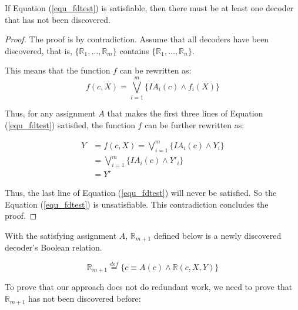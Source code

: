 \documentclass[journal]{IEEEtran}
\begin{document}
\begin{theorem}\label{thm_fdok1}
If Equation (\ref{equ_fdtest}) is satisfiable,
then there must be at least one decoder that has not been discovered.
\end{theorem}
\begin{proof}
The proof is by contradiction.
Assume that all decoders have been discovered,
that is,
$\{\mathbb{R}_1,\dots,\mathbb{R}_{m}\}$ contains $\{\mathbb{R}_1,\dots,\mathbb{R}_{n}\}$.

This means that the function $f$ can be rewritten as:
\begin{equation}\label{equ_fdfrewagain1}
f(c,X)=\bigvee _{i=1}^{m} \{IA_i(c)\wedge f_i(X)\}
\end{equation}

Thus,
for any assignment $A$ that makes the first three lines of Equation (\ref{equ_fdtest}) satisfied,
the function $f$ can be further rewritten as:

\begin{equation}\label{equ_fdfrewagain2}
\begin{split}
Y&=f(c,X)=\bigvee _{i=1}^{m} \{IA_i(c)\wedge Y_i\}\\
 &=\bigvee _{i=1}^{m} \{IA_i(c)\wedge Y'_i\}\\
 &=Y'
\end{split}
\end{equation}

Thus,
the last line of Equation (\ref{equ_fdtest}) will never be satisfied.
So the Equation (\ref{equ_fdtest}) is unsatisfiable.
This contradiction concludes the proof.
\end{proof}

With the satisfying assignment $A$,
$\mathbb{R}_{m+1}$ defined below is a newly discovered decoder's Boolean relation.

\begin{equation}\label{equ_newR}
\mathbb{R}_{m+1}\stackrel{def}{=}\{c\equiv A(c)\wedge \mathbb{R}(c,X,Y)\}
\end{equation}

To prove that our approach does not do redundant work,
we need to prove that $\mathbb{R}_{m+1}$ has not been discovered before:
\end{document}
